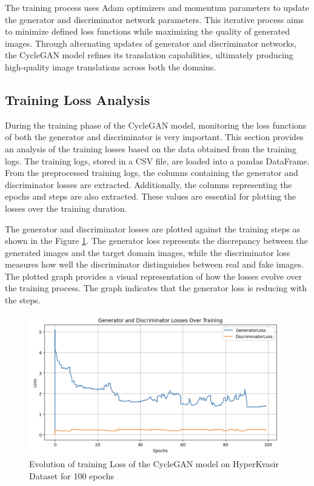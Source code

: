 \documentclass[UKenglish,12pt]{master-style}
\begin{document}
The training process uses Adam optimizers and momentum parameters to update the generator and discriminator network parameters. This iterative process aims to minimize defined loss functions while maximizing the quality of generated images. Through alternating updates of generator and discriminator networks, the CycleGAN model refines its translation capabilities, ultimately producing high-quality image translations across both the  domains.

\subsection{Training Loss Analysis}

During the training phase of the CycleGAN model, monitoring the loss functions of both the generator and discriminator is very important. This section provides an analysis of the training losses based on the data obtained from the training logs. The training logs, stored in a CSV file, are loaded into a pandas DataFrame. From the preprocessed training logs, the columns containing the generator and discriminator losses are extracted. Additionally, the columns representing the epochs and steps are also extracted. These values are essential for plotting the losses over the training duration.

The generator and discriminator losses are plotted against the training steps as shown in the Figure \ref{fig:Training_Loss}. The generator loss represents the discrepancy between the generated images and the target domain images, while the discriminator loss measures how well the discriminator distinguishes between real and fake images. The plotted graph provides a visual representation of how the losses evolve over the training process. The graph indicates that the generator loss is reducing with the steps.


\begin{figure}[htbp]
    \centering
    \includegraphics[width=1\textwidth]{Images/Training_Loss.png}
    \caption{Evolution of training Loss of the CycleGAN model on HyperKvasir Dataset for 100 epochs}
    \label{fig:Training_Loss}
\end{figure}
\end{document}
